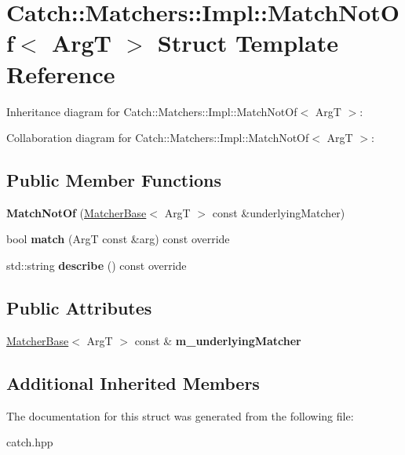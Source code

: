 \hypertarget{structCatch_1_1Matchers_1_1Impl_1_1MatchNotOf}{}\section{Catch\+:\+:Matchers\+:\+:Impl\+:\+:Match\+Not\+Of$<$ ArgT $>$ Struct Template Reference}
\label{structCatch_1_1Matchers_1_1Impl_1_1MatchNotOf}


Inheritance diagram for Catch\+:\+:Matchers\+:\+:Impl\+:\+:Match\+Not\+Of$<$ ArgT $>$\+:


Collaboration diagram for Catch\+:\+:Matchers\+:\+:Impl\+:\+:Match\+Not\+Of$<$ ArgT $>$\+:
\subsection*{Public Member Functions}
\begin{DoxyCompactItemize}
\item 
{\bfseries Match\+Not\+Of} (\hyperlink{structCatch_1_1Matchers_1_1Impl_1_1MatcherBase}{Matcher\+Base}$<$ ArgT $>$ const \&underlying\+Matcher)\hypertarget{structCatch_1_1Matchers_1_1Impl_1_1MatchNotOf_a47afdd9e4c3354cef85adc3186097ae4}{}\label{structCatch_1_1Matchers_1_1Impl_1_1MatchNotOf_a47afdd9e4c3354cef85adc3186097ae4}

\item 
bool {\bfseries match} (ArgT const \&arg) const override\hypertarget{structCatch_1_1Matchers_1_1Impl_1_1MatchNotOf_a181d693c0258e582d80dc6117a1f2b66}{}\label{structCatch_1_1Matchers_1_1Impl_1_1MatchNotOf_a181d693c0258e582d80dc6117a1f2b66}

\item 
std\+::string {\bfseries describe} () const override\hypertarget{structCatch_1_1Matchers_1_1Impl_1_1MatchNotOf_ac5fb4ef6a9069d23a4098c3c818f06b0}{}\label{structCatch_1_1Matchers_1_1Impl_1_1MatchNotOf_ac5fb4ef6a9069d23a4098c3c818f06b0}

\end{DoxyCompactItemize}
\subsection*{Public Attributes}
\begin{DoxyCompactItemize}
\item 
\hyperlink{structCatch_1_1Matchers_1_1Impl_1_1MatcherBase}{Matcher\+Base}$<$ ArgT $>$ const \& {\bfseries m\+\_\+underlying\+Matcher}\hypertarget{structCatch_1_1Matchers_1_1Impl_1_1MatchNotOf_af7ac67f112b0e93796b048a47329aad4}{}\label{structCatch_1_1Matchers_1_1Impl_1_1MatchNotOf_af7ac67f112b0e93796b048a47329aad4}

\end{DoxyCompactItemize}
\subsection*{Additional Inherited Members}


The documentation for this struct was generated from the following file\+:\begin{DoxyCompactItemize}
\item 
catch.\+hpp\end{DoxyCompactItemize}
